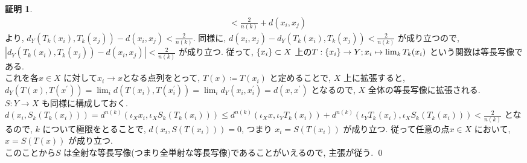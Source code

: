 \documentclass[10pt, fleqn, label-section=none]{bxjsarticle}
\theoremstyle{definition}
\newtheorem*{pf*}{証明}
\newcommand{\cbra}[1]{\mleft\{#1\mright\}}
\newcommand{\abs}[1]{\left|#1\right|}
\begin{document}
\begin{pf*}
\begin{align*}
&< \frac{2}{n(k)} + d(x_i, x_j)
\end{align*}
より, $d_Y (T_k(x_i), T_k(x_j) ) - d(x_i, x_j) < \frac{2}{n(k)}$. 同様に, $d(x_i, x_j) - d_Y (T_k(x_i), T_k(x_j) ) < \frac{2}{n(k)}$ が成り立つので, \\
$\abs{d_Y (T_k(x_i), T_k(x_j) ) - d(x_i, x_j) }< \frac{2}{n(k)}$ が成り立つ. 従って, $\cbra{x_i} \subset X$ 上の$T:\cbra{x_i} \rightarrow Y; x_i \mapsto \lim_k T_k(x_i)$ という関数は等長写像である. \\
これを各$x\in X$ に対して$x_i \rightarrow x$となる点列をとって, $T(x) \coloneqq T(x_i) $ と定めることで, $X$ 上に拡張すると, \\
$d_Y (T(x), T(x^\prime)) = \lim_i d(T(x_i), T(x_i^\prime)) = \lim_i d_Y (x_i, x_i^\prime) = d(x, x^\prime)$ となるので, $X$ 全体の等長写像に拡張される. \\
$S:Y\rightarrow X$ も同様に構成しておく. \\
$d(x_i , S_k(T_k(x_i))) = d^{n(k)}(\iota_X x_i , \iota_X S_k(T_k(x_i ))) \leq d^{n(k)} (\iota_X x, \iota_Y T_k(x_i)) + d^{n(k)} (\iota_Y T_k(x_i), \iota_X S_k (T_k(x_i))) < \frac{2}{n(k)}  $ となるので, $k$ について極限をとることで, $d(x_i , S(T(x_i))) = 0$, つまり $x_i = S(T(x_i))$ が成り立つ. 従って任意の点$x \in X$ において, $x = S(T(x))$ が成り立つ. \\
このことから$S$ は全射な等長写像(つまり全単射な等長写像)であることがいえるので, 主張が従う. 
\qed
\end{pf*}
\end{document}
